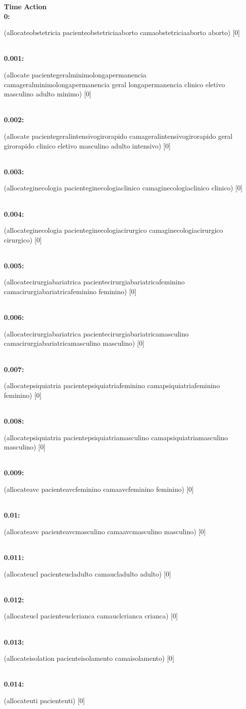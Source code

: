 \documentclass[a4paper,12pt]{article}
\newcommand{\headingtimeaction}{{\bf Time} \qquad \= {\bf Action}\\[0.8ex]}
\newcommand{\atime}[1]{{\bf #1:}}
\newcommand{\action}[1]{{\sf #1}}
\newcommand{\listrow}[1]{\begin{minipage}[t]{11.5cm} #1 \end{minipage}}
\begin{document}
\begin{tabbing}
\headingtimeaction 
\atime{0} \> \listrow{\action{(allocateobstetricia pacienteobstetriciaaborto camaobstetriciaaborto aborto) [0]}}\\
\atime{0.001} \> \listrow{\action{(allocate pacientegeralminimolongapermanencia camageralminimolongapermanencia geral longapermanencia clinico eletivo masculino adulto minimo) [0]}}\\
\atime{0.002} \> \listrow{\action{(allocate pacientegeralintensivogirorapido camageralintensivogirorapido geral girorapido clinico eletivo masculino adulto intensivo) [0]}}\\
\atime{0.003} \> \listrow{\action{(allocateginecologia pacienteginecologiaclinico camaginecologiaclinico clinico) [0]}}\\
\atime{0.004} \> \listrow{\action{(allocateginecologia pacienteginecologiacirurgico camaginecologiacirurgico cirurgico) [0]}}\\
\atime{0.005} \> \listrow{\action{(allocatecirurgiabariatrica pacientecirurgiabariatricafeminino camacirurgiabariatricafeminino feminino) [0]}}\\
\atime{0.006} \> \listrow{\action{(allocatecirurgiabariatrica pacientecirurgiabariatricamasculino camacirurgiabariatricamasculino masculino) [0]}}\\
\atime{0.007} \> \listrow{\action{(allocatepsiquiatria pacientepsiquiatriafeminino camapsiquiatriafeminino feminino) [0]}}\\
\atime{0.008} \> \listrow{\action{(allocatepsiquiatria pacientepsiquiatriamasculino camapsiquiatriamasculino masculino) [0]}}\\
\atime{0.009} \> \listrow{\action{(allocateavc pacienteavcfeminino camaavcfeminino feminino) [0]}}\\
\atime{0.01} \> \listrow{\action{(allocateavc pacienteavcmasculino camaavcmasculino masculino) [0]}}\\
\atime{0.011} \> \listrow{\action{(allocateucl pacienteucladulto camaucladulto adulto) [0]}}\\
\atime{0.012} \> \listrow{\action{(allocateucl pacienteuclcrianca camauclcrianca crianca) [0]}}\\
\atime{0.013} \> \listrow{\action{(allocateisolation pacienteisolamento camaisolamento) [0]}}\\
\atime{0.014} \> \listrow{\action{(allocateuti pacienteuti) [0]}}\\
\end{tabbing}
\end{document}
